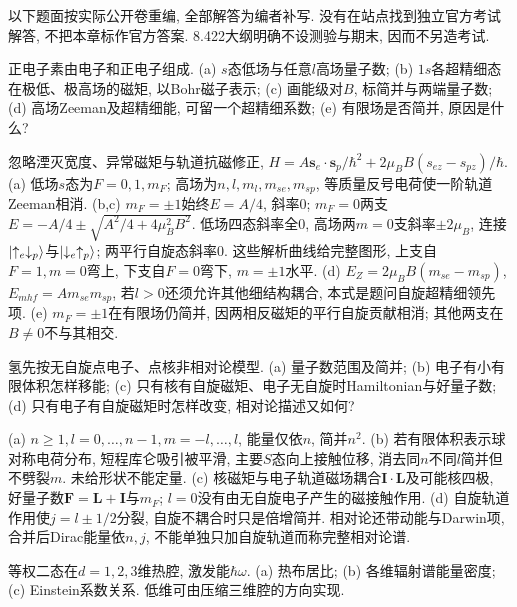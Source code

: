以下题面按实际公开卷重编, 全部解答为编者补写. 没有在站点找到独立官方考试解答, 不把本章标作官方答案. 8.422大纲明确不设测验与期末, 因而不另造考试.
\begin{exercise}正电子素由电子和正电子组成. (a) $s$态低场与任意$l$高场量子数; (b) $1s$各超精细态在极低、极高场的磁矩, 以Bohr磁子表示; (c) 画能级对$B$, 标简并与两端量子数; (d) 高场Zeeman及超精细能, 可留一个超精细系数; (e) 有限场是否简并, 原因是什么?\end{exercise}
\begin{solution}忽略湮灭宽度、异常磁矩与轨道抗磁修正, $H=A\mathbf s_e\cdot\mathbf s_p/\hbar^2+2\mu_BB(s_{ez}-s_{pz})/\hbar$. (a) 低场$s$态为$F=0,1,m_F$; 高场为$n,l,m_l,m_{se},m_{sp}$, 等质量反号电荷使一阶轨道Zeeman相消. (b,c) $m_F=\pm1$始终$E=A/4$, 斜率0; $m_F=0$两支$E=-A/4\pm\sqrt{A^2/4+4\mu_B^2B^2}$. 低场四态斜率全0, 高场两$m=0$支斜率$\pm2\mu_B$, 连接$\lvert \uparrow_e\downarrow_p\rangle$与$\lvert \downarrow_e\uparrow_p\rangle$; 两平行自旋态斜率0. 这些解析曲线给完整图形, 上支自$F=1,m=0$弯上, 下支自$F=0$弯下, $m=\pm1$水平. (d) $E_Z=2\mu_BB(m_{se}-m_{sp})$, $E_{
m hf}=Am_{se}m_{sp}$, 若$l>0$还须允许其他细结构耦合, 本式是题问自旋超精细领先项. (e) $m_F=\pm1$在有限场仍简并, 因两相反磁矩的平行自旋贡献相消; 其他两支在$B\ne0$不与其相交.
\end{solution}
\begin{exercise}氢先按无自旋点电子、点核非相对论模型. (a) 量子数范围及简并; (b) 电子有小有限体积怎样移能; (c) 只有核有自旋磁矩、电子无自旋时Hamiltonian与好量子数; (d) 只有电子有自旋磁矩时怎样改变, 相对论描述又如何?\end{exercise}
\begin{solution}(a) $n\ge1,l=0,\ldots,n-1,m=-l,\ldots,l$, 能量仅依$n$, 简并$n^2$. (b) 若有限体积表示球对称电荷分布, 短程库仑吸引被平滑, 主要$S$态向上接触位移, 消去同$n$不同$l$简并但不劈裂$m$. 未给形状不能定量. (c) 核磁矩与电子轨道磁场耦合$\mathbf I\cdot\mathbf L$及可能核四极, 好量子数$\mathbf F=\mathbf L+\mathbf I$与$m_F$; $l=0$没有由无自旋电子产生的磁接触作用. (d) 自旋轨道作用使$j=l\pm1/2$分裂, 自旋不耦合时只是倍增简并. 相对论还带动能与Darwin项, 合并后Dirac能量依$n,j$, 不能单独只加自旋轨道而称完整相对论谱.
\end{solution}
\begin{exercise}等权二态在$d=1,2,3$维热腔, 激发能$\hbar\omega$. (a) 热布居比; (b) 各维辐射谱能量密度; (c) Einstein系数关系. 低维可由压缩三维腔的方向实现.\end{exercise}
